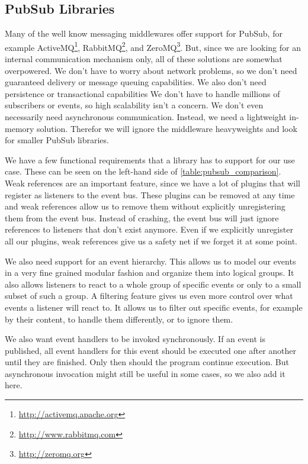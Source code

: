 \subsection{PubSub Libraries}
\label{implementation:selecting:pubsub}

Many of the well know messaging middlewares offer support for PubSub, for example ActiveMQ\footnote{\url{http://activemq.apache.org}}, RabbitMQ\footnote{\url{http://www.rabbitmq.com}}, and ZeroMQ\footnote{\url{http://zeromq.org}}.
But, since we are looking for an internal communication mechanism only, all of these solutions are somewhat overpowered.
We don't have to worry about network problems, so we don't need guaranteed delivery or message queuing capabilities.
We also don't need persistence or transactional capabilities
We don't have to handle millions of subscribers or events, so high scalability isn't a concern.
We don't even necessarily need asynchronous communication.
Instead, we need a lightweight in-memory solution.
Therefor we will ignore the middleware heavyweights and look for smaller PubSub libraries.

We have a few functional requirements that a library has to support for our use case.
These can be seen on the left-hand side of \autoref{table:pubsub_comparison}.
Weak references are an important feature, since we have a lot of plugins that will register as listeners to the event bus.
These plugins can be removed at any time and weak references allow us to remove them without explicitly unregistering them from the event bus.
Instead of crashing, the event bus will just ignore references to listeners that don't exist anymore.
Even if we explicitly unregister all our plugins, weak references give us a safety net if we forget it at some point.

We also need support for an event hierarchy.
This allows us to model our events in a very fine grained modular fashion and organize them into logical groups.
It also allows listeners to react to a whole group of specific events or only to a small subset of such a group.
A filtering feature gives us even more control over what events a listener will react to.
It allows us to filter out specific events, for example by their content, to handle them differently, or to ignore them.

We also want event handlers to be invoked synchronously.
If an event is published, all event handlers for this event should be executed one after another until they are finished.
Only then should the program continue execution.
But asynchronous invocation might still be useful in some cases, so we also add it here.


